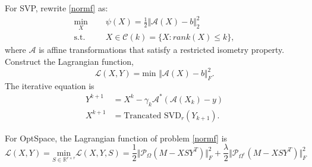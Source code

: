 \documentclass{article}
\begin{document}
{For SVP, rewrite \eqref{normf} as:
\begin{equation}
	\begin{aligned}
		\underset{X}{\text{min}} \ \ \ \ &  \ \ \psi (X) = \frac{1}{2}\Vert \mathcal{A}(X) - b\Vert_2^2\\
		\text{s.t.} \ \ \ \ &  \ \  X \in \mathcal{C}(k) = \{X \colon rank(X) \leq k\},
	\end{aligned}
\end{equation}
where $\mathcal{A}$ is affine transformations that satisfy a restricted isometry property.
Construct the Lagrangian function,
\begin{equation}
	\mathcal{L}(X,Y) = \text{min } \Vert \mathcal{A}(X) - b \Vert_F^2.
\end{equation}
The iterative equation is
\begin{equation}
	\begin{aligned}
		Y^{k+1} & = X^{k} - \gamma_k \mathcal{A}^*(\mathcal{A}(X_k)-y)\\
		X^{k+1} & = \text{Trancated SVD}_r(Y_{k+1}).
	\end{aligned}
\end{equation}

For OptSpace, the Lagrangian function of problem \eqref{normf} is
\begin{equation}
	\mathcal{L}(X,Y) = \underset{S \in \mathbb{R}^{r \times r}}{\text{min}} 	\mathcal{L}(X,Y,S) = \frac{1}{2} \Vert \mathcal{P}_\Omega(M-XSY^T)\Vert_F^2+\frac{\lambda}{2}\Vert \mathcal{P}_{\Omega^c}(M-XSY^T)\Vert_F^2
\end{equation}



}
\end{document}
